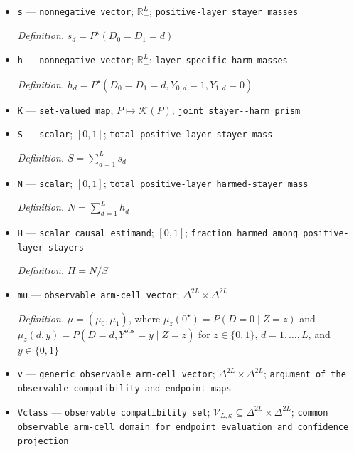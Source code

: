 \documentclass{article}
\begin{document}
\begin{itemize}
  \par\smallskip\noindent\emph{Definition.} \(b_d=\min\{q_{0d},c_d-q_{1d}\}\), \(d=1,\ldots,L\)
  \item \texttt{s} --- \texttt{nonnegative vector}; \(\mathbb R_+^{L}\); \texttt{positive-\allowbreak{}layer stayer masses}
  \par\smallskip\noindent\emph{Definition.} \(s_d=P^{\star}(D_0=D_1=d)\)
  \item \texttt{h} --- \texttt{nonnegative vector}; \(\mathbb R_+^{L}\); \texttt{layer-\allowbreak{}specific harm masses}
  \par\smallskip\noindent\emph{Definition.} \(h_d=P^{\star}(D_0=D_1=d,Y_{0,d}=1,Y_{1,d}=0)\)
  \item \texttt{K} --- \texttt{set-\allowbreak{}valued map}; \(P\mapsto\mathcal K(P)\); \texttt{joint stayer-\allowbreak{}-\allowbreak{}harm prism}
  \item \texttt{S} --- \texttt{scalar}; \([0,1]\); \texttt{total positive-\allowbreak{}layer stayer mass}
  \par\smallskip\noindent\emph{Definition.} \(S=\sum_{d=1}^{L}s_d\)
  \item \texttt{N} --- \texttt{scalar}; \([0,1]\); \texttt{total positive-\allowbreak{}layer harmed-\allowbreak{}stayer mass}
  \par\smallskip\noindent\emph{Definition.} \(N=\sum_{d=1}^{L}h_d\)
  \item \texttt{H} --- \texttt{scalar causal estimand}; \([0,1]\); \texttt{fraction harmed among positive-\allowbreak{}layer stayers}
  \par\smallskip\noindent\emph{Definition.} \(H=N/S\)
  \item \texttt{mu} --- \texttt{observable arm-\allowbreak{}cell vector}; \(\Delta^{2L}\times\Delta^{2L}\)
  \par\smallskip\noindent\emph{Definition.} \(\mu=(\mu_0,\mu_1)\), where \(\mu_z(0^{\star})=P(D=0\mid Z=z)\) and \(\mu_z(d,y)=P(D=d,Y^{\mathrm{obs}}=y\mid Z=z)\) for \(z\in\{0,1\}\), \(d=1,\ldots,L\), and \(y\in\{0,1\}\)
  \item \texttt{v} --- \texttt{generic observable arm-\allowbreak{}cell vector}; \(\Delta^{2L}\times\Delta^{2L}\); \texttt{argument of the observable compatibility and endpoint maps}
  \item \texttt{Vclass} --- \texttt{observable compatibility set}; \(\mathcal V_{L,\kappa}\subseteq\Delta^{2L}\times\Delta^{2L}\); \texttt{common observable arm-\allowbreak{}cell domain for endpoint evaluation and confidence projection}

\end{itemize}
\end{document}
